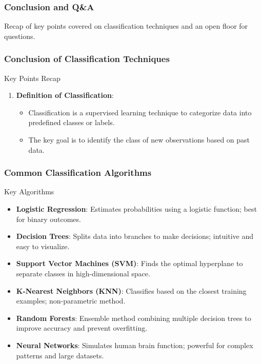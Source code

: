 \documentclass[aspectratio=169]{beamer}
\begin{document}
\begin{frame}[fragile]
    \frametitle{Conclusion and Q\&A}
    Recap of key points covered on classification techniques and an open floor for questions.
\end{frame}

\begin{frame}[fragile]
    \frametitle{Conclusion of Classification Techniques}
    
    \begin{block}{Key Points Recap}
        \begin{enumerate}
            \item \textbf{Definition of Classification}:
                \begin{itemize}
                    \item Classification is a supervised learning technique to categorize data into predefined classes or labels.
                    \item The key goal is to identify the class of new observations based on past data.
                \end{itemize}
        \end{enumerate}
    \end{block}
\end{frame}

\begin{frame}[fragile]
    \frametitle{Common Classification Algorithms}
    
    \begin{block}{Key Algorithms}
        \begin{itemize}
            \item \textbf{Logistic Regression}: Estimates probabilities using a logistic function; best for binary outcomes.
            \item \textbf{Decision Trees}: Splits data into branches to make decisions; intuitive and easy to visualize.
            \item \textbf{Support Vector Machines (SVM)}: Finds the optimal hyperplane to separate classes in high-dimensional space.
            \item \textbf{K-Nearest Neighbors (KNN)}: Classifies based on the closest training examples; non-parametric method.
            \item \textbf{Random Forests}: Ensemble method combining multiple decision trees to improve accuracy and prevent overfitting.
            \item \textbf{Neural Networks}: Simulates human brain function; powerful for complex patterns and large datasets.
        \end{itemize}
    \end{block}
\end{frame}
\end{document}
